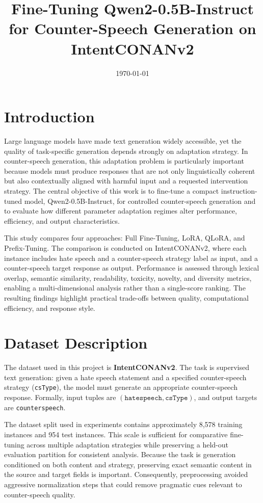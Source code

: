 \documentclass[11pt]{article}
\title{Fine-Tuning Qwen2-0.5B-Instruct for Counter-Speech Generation on IntentCONANv2}
\author{}
\date{\today}
\begin{document}
\maketitle
\onehalfspacing

\section{Introduction}
Large language models have made text generation widely accessible, yet the quality of task-specific generation depends strongly on adaptation strategy. In counter-speech generation, this adaptation problem is particularly important because models must produce responses that are not only linguistically coherent but also contextually aligned with harmful input and a requested intervention strategy. The central objective of this work is to fine-tune a compact instruction-tuned model, Qwen2-0.5B-Instruct, for controlled counter-speech generation and to evaluate how different parameter adaptation regimes alter performance, efficiency, and output characteristics.

This study compares four approaches: Full Fine-Tuning, LoRA, QLoRA, and Prefix-Tuning. The comparison is conducted on IntentCONANv2, where each instance includes hate speech and a counter-speech strategy label as input, and a counter-speech target response as output. Performance is assessed through lexical overlap, semantic similarity, readability, toxicity, novelty, and diversity metrics, enabling a multi-dimensional analysis rather than a single-score ranking. The resulting findings highlight practical trade-offs between quality, computational efficiency, and response style.

\section{Dataset Description}
The dataset used in this project is \textbf{IntentCONANv2}. The task is supervised text generation: given a hate speech statement and a specified counter-speech strategy (\texttt{csType}), the model must generate an appropriate counter-speech response. Formally, input tuples are \((\texttt{hatespeech}, \texttt{csType})\), and output targets are \texttt{counterspeech}.

The dataset split used in experiments contains approximately 8,578 training instances and 954 test instances. This scale is sufficient for comparative fine-tuning across multiple adaptation strategies while preserving a held-out evaluation partition for consistent analysis. Because the task is generation conditioned on both content and strategy, preserving exact semantic content in the source and target fields is important. Consequently, preprocessing avoided aggressive normalization steps that could remove pragmatic cues relevant to counter-speech quality.
\end{document}
